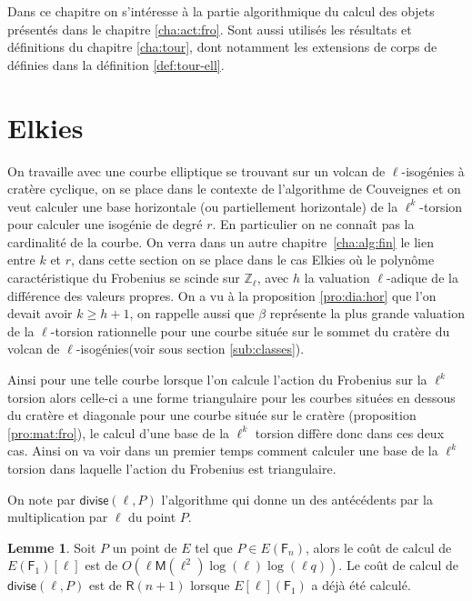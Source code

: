 \documentclass[10pt,a4paper]{book}
\theoremstyle{plain}
\theoremstyle{definition}
\newtheorem{lem}[thm]{Lemme}
\theoremstyle{definition}
\theoremstyle{definition}
\theoremstyle{definition}
\theoremstyle{remark}
\theoremstyle{remark}
\theoremstyle{definition}
\begin{document}
Dans ce chapitre on s'intéresse à la partie algorithmique du calcul des objets présentés dans le chapitre \ref{cha:act:fro}. Sont aussi utilisés les résultats et définitions du chapitre \ref{cha:tour}, dont notamment les extensions de corps de définies dans la définition \ref{def:tour-ell}.

\section{Elkies}
On travaille avec une courbe elliptique se trouvant sur un volcan de $\ell$-isogénies à cratère cyclique, on se place dans le contexte de l'algorithme de Couveignes et on veut calculer une base horizontale (ou partiellement horizontale) de la $\ell^k$-torsion pour calculer une isogénie de degré $r$. En particulier on ne connaît pas la cardinalité de la courbe. On verra dans un autre chapitre~\ref{cha:alg:fin} le lien entre $k$ et $r$, dans cette section on se place dans le cas Elkies où le polynôme caractéristique du Frobenius se scinde sur $\mathbb{Z}_{\ell}$, avec $h$ la valuation $\ell$-adique de la différence des valeurs propres. On a vu à la proposition \ref{pro:dia:hor} que l'on devait avoir $k \geqslant h+1$, on rappelle aussi que $\beta$ représente la plus grande valuation de la $\ell$-torsion rationnelle pour une courbe située sur le sommet du cratère du volcan de $\ell$-isogénies(voir sous section \ref{sub:classes}).

Ainsi pour une telle courbe lorsque l'on calcule l'action du Frobenius sur la $\ell^k$ torsion alors celle-ci a une forme triangulaire pour les courbes situées en dessous du cratère et diagonale pour une courbe située sur le cratère (proposition \ref{pro:mat:fro}), le calcul d'une base de la $\ell^k$ torsion diffère donc dans ces deux cas. Ainsi on va voir dans un premier temps comment calculer une base de la $\ell^k$ torsion dans laquelle l'action du Frobenius est triangulaire.

On note par $\mathsf{divise}(\ell,P)$ l'algorithme qui donne un des antécédents par la multiplication par $\ell$ du point $P$.

\begin{lem}
\label{lem:div:cou}
Soit $P$ un point de $E$ tel que $P \in E(\mathsf{F}_{n})$, alors le coût de calcul de $E(\mathsf{F}_1)[\ell]$ est de $O(\ell \mathsf{M}(\ell^2)\log(\ell)\log(\ell q))$. Le coût de calcul de $\mathsf{divise}(\ell,P)$ est de $\mathsf{R}(n+1)$ lorsque $E[\ell](\mathsf{F}_1)$ a déjà été calculé.
\end{lem}
\end{document}
